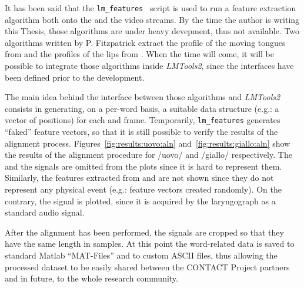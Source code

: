 It has been said that the 
{\tt lm\_features} ~script
is used to run a feature extraction algorithm both onto the  
and the  video streams.
By the time the author is writing this Thesis, those algorithms are under heavy
devepment, thus not available.
Two algorithms written by P. Fitzpatrick extract the profile of the moving
tongues from  and the profiles of the lips from .
When the time will come, it will be possible to integrate those algorithms 
inside \emph{LMTools2}, since the interfaces have been defined prior to the
development.

 
The main idea behind the interface between those algorithms and \emph{LMTools2}
consists in generating, on a per-word basis, a suitable data structure
(e.g.: a vector of positions) for each  and  frame.
Temporarily, {\tt lm\_features} generates ``faked'' feature vectors,
so that it is still possible to verify the results of the alignment process.
Figures~\ref{fig:results:uovo:aln} and~\ref{fig:results:giallo:aln} show the
results of the alignment procedure for /uovo/ and /giallo/ respectively.
The  and the  signals are omitted from the plots
since it is hard to represent them.
Similarly, the features extracted from  and  are not
shown since they do not represent any physical event (e.g.: feature vectors
created randomly).
On the contrary, the  signal is plotted, since it is acquired by the
laryngograph as a standard audio signal. 

After the alignment has been performed, the signals are cropped so that they 
have the same length in samples. At this point the word-related data is saved to
standard Matlab ``MAT-Files'' and to custom ASCII files, thus allowing the 
processed dataset to be easily shared between the CONTACT Project partners and
in future, to the whole research community.
